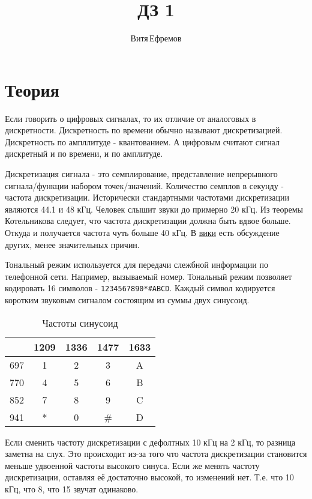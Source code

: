 \documentclass[a4paper,12pt]{article}
\begin{document}
\sloppy

\title{ДЗ 1}
\author{Витя\,Ефремов}
\maketitle

\tableofcontents

\section{Теория}
Если говорить о цифровых сигналах, то их отличие от аналоговых в дискретности.
Дискретность по времени обычно называют дискретизацией.
Дискретность по ампллитуде - квантованием.
А цифровым считают сигнал дискретный и по времени, и по амплитуде.

Дискретизация сигнала - это семплирование, представление непрерывного сигнала/функции набором точек/значений.
Количество семплов в секунду - частота дискретизации.
Исторически стандартными частотами дискретизации являются 44.1 и 48 кГц.
Человек слышит звуки до примерно 20 кГц.
Из теоремы Котельникова следует, что частота дискретизации должна быть вдвое больше.
Откуда и получается частота чуть больше 40 кГц.
В \href{https://en.wikipedia.org/wiki/44,100_Hz}{вики} есть обсуждение других, менее значительных причин.

Тональный режим используется для передачи слежбной информации по телефонной сети.
Например, вызываемый номер.
Тональный режим позволяет кодировать 16 символов - \texttt{1234567890*\#ABCD}.
Каждый символ кодируется коротким звуковым сигналом состоящим из суммы двух синусоид.

\begin{table*}[ht]
    \centering
    \begin{tabular}{|c|c|c|c|c|}
        \hline & 1209 & 1336 & 1477 & 1633 \\
        \hline 697 & 1 & 2 & 3 & A \\
        \hline 770 & 4 & 5 & 6 & B \\
        \hline 852 & 7 & 8 & 9 & C \\
        \hline 941 & * & 0 & \# & D \\
        \hline
    \end{tabular}
    \caption{Частоты синусоид}
\end{table*}

Если сменить частоту дискретизации с дефолтных 10 кГц на 2 кГц, то разница заметна на слух.
Это происходит из-за того что частота дискретизации становится меньше удвоенной частоты высокого синуса.
Если же менять частоту дискретизации, оставляя её достаточно высокой, то изменений нет.
Т.е. что 10 кГц, что 8, что 15 звучат одинаково.
\end{document}
